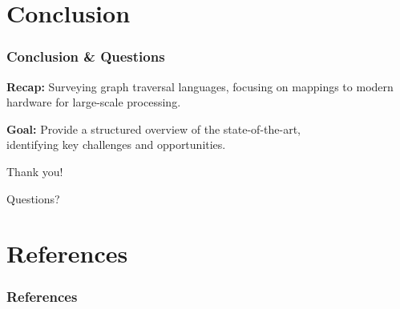 \documentclass[
	aspectratio=169,
	compress,
]{beamer}
\newcommand{\navframetitle}[1]{\frametitle{#1\hfill{\footnotesize\lastsection{}}}}
\begin{document}
\section{Conclusion}
\label{sec:conclusion}

\begin{frame}
	\navframetitle{Conclusion \& Questions}

    \textbf{Recap:} Surveying graph traversal languages, focusing on mappings to modern\\\hspace{3.05em} hardware for large-scale processing.

    \textbf{Goal:} Provide a structured overview of the state-of-the-art,\\\hspace{2.5em} identifying key challenges and opportunities.

	\vfill %

    \pause

	\centering
	\Large Thank you!

    \pause

	\bigskip
	\normalsize Questions?

\end{frame}

\appendix

\AtBeginSection[]{}
\AtBeginSubsection[]{}

\section{References}

\begin{frame}[allowframebreaks]
	\frametitle{References}

	
	
\end{frame}
\end{document}
